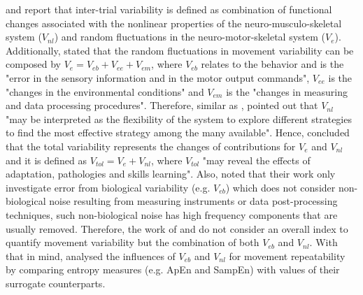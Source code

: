 \cite{preatoni2007} and \cite{preatoni2010, preatoni2013} report  
that inter-trial variability is defined as combination of functional changes 
associated with the nonlinear properties of the neuro-musculo-skeletal 
system ($V_{nl}$) and random fluctuations in the neuro-motor-skeletal 
system ($V_e$).
Additionally, \citealt[p. 72]{preatoni2013} stated that the random fluctuations 
in movement variability can be composed by $V_{e}=V_{eb}+V_{ee}+V_{em}$,
where $V_{eb}$ relates to the behavior and is the "error in the sensory 
information and in the motor output commands",
$V_{ee}$ is the "changes in the environmental conditions" and 
$V_{em}$ is the "changes in measuring and data processing procedures".
Therefore, similar as \cite{hatze1986}, \citealt[p. 77]{preatoni2013} 
pointed out that $V_{nl}$ "may be interpreted as the flexibility of the 
system to explore different strategies to find the most effective 
strategy among the many available".
Hence, \citealt[p. 1328]{preatoni2010} concluded that the total variability 
represents the changes of contributions for $V_e$ and $V_{nl}$ 
and it is defined as $V_{tol}=V_e+V_{nl}$, where $V_{tol}$ 
"may reveal the effects of adaptation, pathologies and skills learning".
Also, \cite{preatoni2013} noted that their work only investigate error from 
biological variability (e.g. $V_{eb}$) which does not consider 
non-biological noise resulting from measuring instruments or 
data post-processing techniques, such 
non-biological noise has high frequency components that are usually removed.
Therefore, the work of \cite{preatoni2010} and \cite{preatoni2013} 
do not consider an overall index to quantify movement variability but 
the combination of both $V_{eb}$ and $V_{nl}$. 
With that in mind, \cite{preatoni2007} analysed the influences of 
$V_{eb}$ and $V_{nl}$ for movement repeatability by comparing entropy measures 
(e.g. ApEn and SampEn) with values of their surrogate counterparts.


